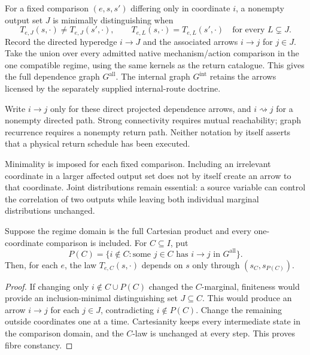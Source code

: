\begin{definition}
For a fixed comparison $(e,s,s')$ differing only in coordinate $i$, a
nonempty output set $J$ is minimally distinguishing when
\[
T_{e,J}(s,\cdot)\ne T_{e,J}(s',\cdot),\qquad
T_{e,L}(s,\cdot)=T_{e,L}(s',\cdot)
\quad\text{for every }L\subsetneq J.
\]
Record the directed hyperedge $i\longrightarrow J$ and the associated
arrows $i\to j$ for $j\in J$. Take the union over every admitted native mechanism/action comparison in the one compatible regime, using the same kernels as the return catalogue. This gives
the full dependence graph $G^{\mathrm{all}}$. The internal graph
$G^{\mathrm{int}}$ retains the arrows licensed by the separately supplied
internal-route doctrine.
\end{definition}

Write $i\to j$ only for these direct projected dependence arrows, and $i\rightsquigarrow j$ for a nonempty directed path. Strong connectivity requires mutual reachability; graph recurrence requires a nonempty return path. Neither notation by itself asserts that a physical return schedule has been executed.

Minimality is imposed for each fixed comparison. Including an irrelevant
coordinate in a larger affected output set does not by itself create an
arrow to that coordinate. Joint distributions remain essential: a source
variable can control the correlation of two outputs while leaving both
individual marginal distributions unchanged.

\begin{proposition}
\label{prop:spc2-parent-factorization}
Suppose the regime domain is the full Cartesian product and every
one-coordinate comparison is included. For $C\subseteq I$, put
\[
P(C)=\{i\notin C:\text{some }j\in C\text{ has }i\to j
          \text{ in }G^{\mathrm{all}}\}.
\]
Then, for each $e$, the law $T_{e,C}(s,\cdot)$ depends on $s$ only through
$(s_C,s_{P(C)})$.
\end{proposition}
\begin{proof}
If changing only $i\notin C\cup P(C)$ changed the $C$-marginal, finiteness
would provide an inclusion-minimal distinguishing set $J\subseteq C$.
This would produce an arrow $i\to j$ for each $j\in J$, contradicting
$i\notin P(C)$. Change the remaining outside coordinates one at a time.
Cartesianity keeps every intermediate state in the comparison domain,
and the $C$-law is unchanged at every step. This proves fibre constancy.
\end{proof}

